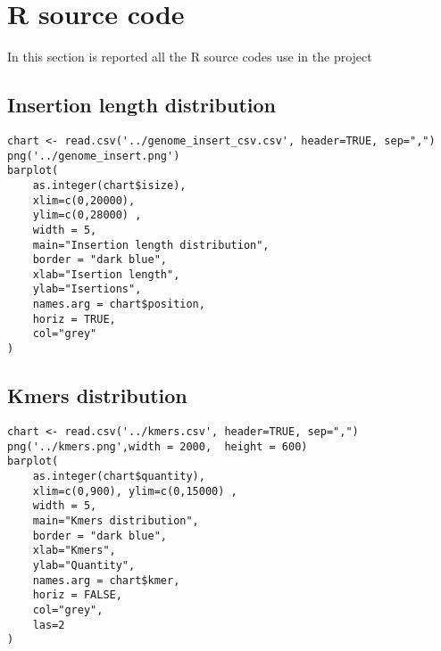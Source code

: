 \section{R source code}
In this section is reported all the R source codes use in the project


\subsection{Insertion length distribution}
\tiny
\begin{verbatim}
chart <- read.csv('../genome_insert_csv.csv', header=TRUE, sep=",")
png('../genome_insert.png')
barplot(
	as.integer(chart$isize), 
	xlim=c(0,20000),
	ylim=c(0,28000) , 
	width = 5,
	main="Insertion length distribution", 
	border = "dark blue", 
	xlab="Isertion length", 
	ylab="Isertions", 
	names.arg = chart$position, 
	horiz = TRUE, 
	col="grey"
)
\end{verbatim}


\subsection{Kmers distribution}
\tiny
\begin{verbatim}
chart <- read.csv('../kmers.csv', header=TRUE, sep=",")
png('../kmers.png',width = 2000,  height = 600)
barplot(
	as.integer(chart$quantity), 
	xlim=c(0,900), ylim=c(0,15000) , 
	width = 5, 
	main="Kmers distribution", 
	border = "dark blue", 
	xlab="Kmers", 
	ylab="Quantity", 
	names.arg = chart$kmer, 
	horiz = FALSE, 
	col="grey", 
	las=2
)
\end{verbatim}